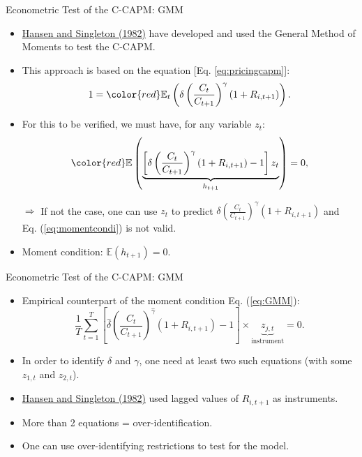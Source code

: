 \begin{frame}{Econometric Test of the C-CAPM: GMM}\label{slide:gmm}
\begin{footnotesize}
\begin{itemize}
	\item \href{https://www.jstor.org/stable/1911873?seq=1\#page_scan_tab_contents}{Hansen and Singleton (1982)} have developed and used the General Method of Moments to test the C-CAPM.
	\item This approach is based on the equation [Eq. \ref{eq:pricingcapm}]:
	\begin{equation}\label{eq:momentcondi}
	1 = {\color{red}\mathbb{E}_t}\left( \delta \left(\frac{C_t}{C_{t+1}}\right)^\gamma (1+R_{i,t+1})\right).
	\end{equation}
	\item For this to be verified, we must have, for any variable $z_t$:
	\begin{equation}\label{eq:GMM}
	{\color{red}\mathbb{E}}\left( \underbrace{\left[\delta \left(\frac{C_t}{C_{t+1}}\right)^\gamma (1+R_{i,t+1}) - 1\right] z_t}_{h_{t+1}}\right) = 0,
	\end{equation}
	\item[$\Rightarrow$] If not the case, one can use $z_t$ to predict $\delta \left(\frac{C_t}{C_{t+1}}\right)^\gamma (1+R_{i,t+1})$ and Eq. (\ref{eq:momentcondi}) is not valid. \hyperlink{slide:linearproj}{}
	\item Moment condition: $\mathbb{E}(h_{t+1})=0$.

\end{itemize}
\end{footnotesize}
\end{frame}

\begin{frame}{Econometric Test of the C-CAPM: GMM}
\begin{footnotesize}
\begin{itemize}
	\item Empirical counterpart of the moment condition Eq. (\ref{eq:GMM}):
	\begin{equation}
	\frac{1}{T}\sum_{t=1}^{T} \left[\hat\delta \left(\frac{C_t}{C_{t+1}}\right)^{\hat\gamma} (1+R_{i,t+1}) - 1\right] \times\underbrace{z_{j,t}}_{\mbox{instrument}} = 0.
	\end{equation}
	\item In order to identify $\delta$ and $\gamma$, one need at least two such equations (with some $z_{1,t}$ and $z_{2,t}$).
	\item \href{https://www.jstor.org/stable/1911873?seq=1\#page_scan_tab_contents}{Hansen and Singleton (1982)} used lagged values of $R_{i,t+1}$ as instruments. \begin{tiny}\end{tiny}
	\item More than 2 equations = over-identification.
	\item One can use over-identifying restrictions to test for the model.
\end{itemize}
\end{footnotesize}
\end{frame}


